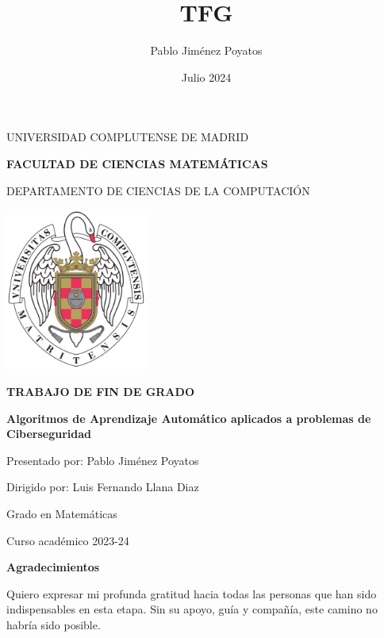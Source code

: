 \documentclass[11pt,a4paper]{book}
\author{Pablo Jiménez Poyatos}
\title{TFG}
\date{Julio 2024}
\begin{document}
\raggedbottom 
{}


\begin{titlepage}
		\centering
		
		{ \Large UNIVERSIDAD COMPLUTENSE DE MADRID}
		
		{ \Large \textbf{FACULTAD DE CIENCIAS MATEMÁTICAS}}
		\vspace{0.8cm}
		
		{ \large DEPARTAMENTO DE CIENCIAS DE LA  COMPUTACIÓN}
		\vspace{1cm}
		
		\vspace{0.6cm}
		
		\graphicspath{ {images/} }
		\includegraphics[width=0.35\textwidth]{img/ucm.png} 
		\vspace{0.4cm}
		
        {\Large \textbf{TRABAJO DE FIN DE GRADO}}
		
		\vspace{8mm}
        {\huge \bfseries Algoritmos de Aprendizaje Automático aplicados a problemas de Ciberseguridad\par}
		\vspace{1cm}

		{\large Presentado por: Pablo Jiménez Poyatos}
		
		{\large Dirigido por: Luis Fernando Llana Diaz}
		
		\vspace{1.5cm}
		{\large Grado en Matemáticas}
		
		{\large Curso académico 2023-24}
\end{titlepage}

\thispagestyle{empty}
\clearpage
\setcounter{page}{1}


\newpage
\begin{center}
   {\bf Agradecimientos} 
\end{center}

Quiero expresar mi profunda gratitud hacia todas las personas que han sido indispensables en esta etapa. Sin su apoyo, guía y compañía, este camino no habría sido posible.
\end{document}
